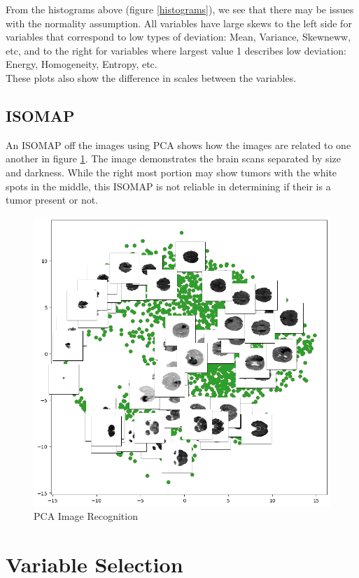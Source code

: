 \documentclass{article}
\begin{document}
From the histograms above (figure \ref{histograms}), we see that there may be issues with the normality assumption. All variables have large skews to the left side for variables that correspond to low types of deviation: Mean, Variance, Skewneww, etc, and to the right for variables where largest value 1 describes low deviation: Energy, Homogeneity, Entropy, etc.\\

These plots also show the difference in scales between the variables.\\

\subsection{ISOMAP}
An ISOMAP off the images using PCA shows how the images are related to one another in figure \ref{pca-image}. The image demonstrates the brain scans separated by size and darkness. While the right most portion may show tumors with the white spots in the middle, this ISOMAP is not reliable in determining if their is a tumor present or not.

\begin{figure}[H]
    \centering
    \includegraphics[width = .8\textwidth]{images/pca-image-clump.png}
    \caption{PCA Image Recognition}
    \label{pca-image}
\end{figure}

\section{Variable Selection} \label{var-sel}
\end{document}
